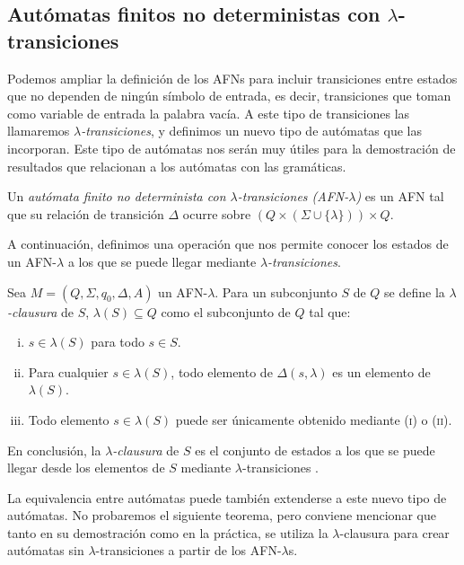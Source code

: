 \subsection{Autómatas finitos no deterministas con $\lambda$-transiciones}

Podemos ampliar la definición de los AFNs para incluir transiciones entre estados que no dependen de ningún símbolo
de entrada, es decir, transiciones que toman como variable de entrada la palabra vacía. A este tipo de transiciones
las llamaremos \textit{$\lambda$-transiciones}, y definimos un nuevo tipo de autómatas que las incorporan. Este tipo
de autómatas nos serán muy útiles para la demostración de resultados que relacionan a los autómatas con las gramáticas.

\begin{definicion} Un 
\textit{autómata finito no determinista con $\lambda$-transiciones (AFN-$\lambda$)} es un AFN tal que su relación de 
transición $\Delta$ ocurre sobre $(Q\times(\Sigma\cup\{\lambda\}))\times Q$.
\end{definicion}

A continuación, definimos una operación que nos permite conocer los estados de un AFN-$\lambda$ a los que se puede
llegar mediante \textit{$\lambda$-transiciones}.

\begin{definicion} Sea $M=(Q,\Sigma,q_0,\Delta,A)$ un AFN-$\lambda$. Para un subconjunto $S$ de $Q$
se define la \textit{$\lambda$-clausura} de $S$, $\lambda(S)\subseteq Q$ como el subconjunto de $Q$ tal que:
\begin{enumerate}[(i)]
    \item $s\in\lambda(S)$ para todo $s\in S$.
    \item Para cualquier $s\in\lambda(S)$, todo elemento de $\Delta(s,\lambda)$ es un elemento de $\lambda(S)$.
    \item Todo elemento $s\in\lambda(S)$ puede ser únicamente obtenido mediante (\textsc{i}) o (\textsc{ii}).
\end{enumerate}
En conclusión, la \textit{$\lambda$-clausura} de $S$ es el conjunto de estados a los que se puede llegar desde los
elementos de $S$ mediante $\lambda$-transiciones \cite{chakraborty_2003}.
\end{definicion}

La equivalencia entre autómatas puede también extenderse a este nuevo tipo de autómatas. No probaremos el siguiente
teorema, pero conviene mencionar que tanto en su demostración como en la práctica, se utiliza la $\lambda$-clausura
para crear autómatas sin $\lambda$-transiciones a partir de los AFN-$\lambda$s.

